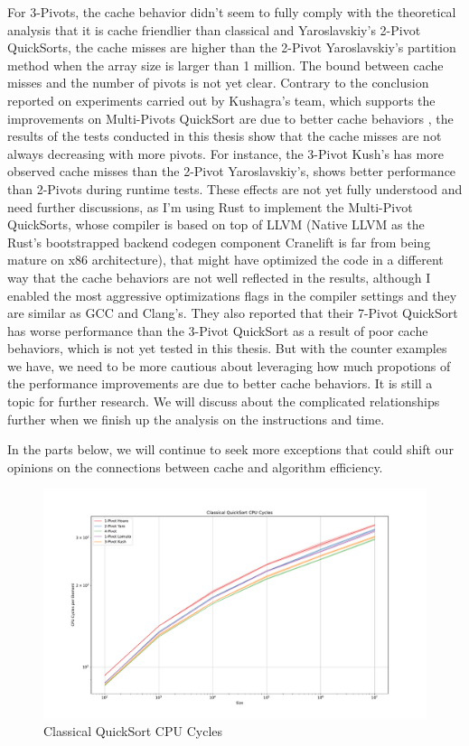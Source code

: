 \documentclass{article}
\begin{document}
For 3-Pivots, the cache behavior didn't seem to fully comply with the theoretical analysis that it is cache friendlier than classical and Yaroslavskiy's 2-Pivot QuickSorts, 
the cache misses are higher than the 2-Pivot Yaroslavskiy's partition method when the array size is larger than 1 million. The bound between cache misses and the number of pivots is not yet clear.
Contrary to the conclusion reported on experiments carried out by Kushagra's team, which supports the improvements on Multi-Pivots QuickSort are due to better cache behaviors
\cite{Kushagra}, the results of the tests conducted in this thesis show that the cache misses are not always decreasing with more pivots. For instance, the 3-Pivot Kush's has more observed cache misses than the 2-Pivot Yaroslavskiy's,
shows better performance than 2-Pivots during runtime tests. These effects are not yet fully understood and need further discussions, as I'm using Rust to implement the Multi-Pivot QuickSorts,
whose compiler is based on top of LLVM (Native LLVM as the Rust's bootstrapped backend codegen component Cranelift is far from being mature on x86 architecture), that might have optimized the code in a different way that the cache behaviors are not well reflected in the results, although I enabled the most aggressive optimizations flags in the compiler settings
and they are similar as GCC and Clang's. They also reported that their 7-Pivot QuickSort has worse performance than the 3-Pivot QuickSort as a result of poor cache behaviors, which is not yet tested in this thesis.
But with the counter examples we have, we need to be more cautious about leveraging how much propotions of the performance improvements are due to better cache behaviors. It is still a topic for further research.
We will discuss about the complicated relationships further when we finish up the analysis on the instructions and time.

In the parts below, we will continue to seek more exceptions that could shift our opinions on the connections between cache and algorithm efficiency.

\begin{figure}[H]
    \hypertarget{fig:classicalcpucycles}{}
    \caption{Classical QuickSort CPU Cycles}
    \centering
    \hspace*{-0.27\textwidth}
    \includegraphics[width=1.5\textwidth]{Classical QuickSort CPU Cycles.pdf}
\end{figure}
\end{document}
